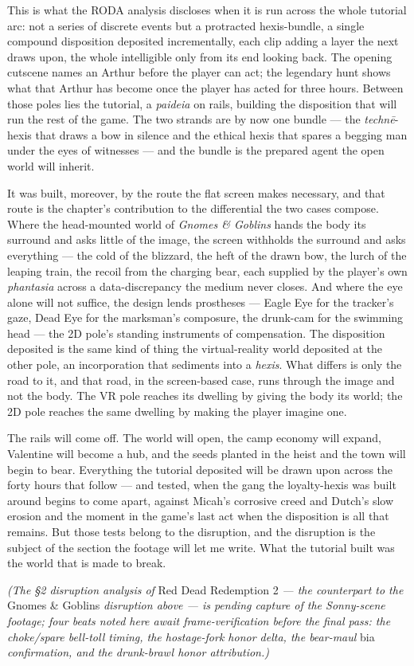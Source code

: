 This is what the RODA analysis discloses when it is run across the whole tutorial arc: not a series of discrete events but a protracted hexis-bundle, a single compound disposition deposited incrementally, each clip adding a layer the next draws upon, the whole intelligible only from its end looking back. The opening cutscene names an Arthur before the player can act; the legendary hunt shows what that Arthur has become once the player has acted for three hours. Between those poles lies the tutorial, a \textit{paideia} on rails, building the disposition that will run the rest of the game. The two strands are by now one bundle — the \textit{technē}-hexis that draws a bow in silence and the ethical hexis that spares a begging man under the eyes of witnesses — and the bundle is the prepared agent the open world will inherit.

It was built, moreover, by the route the flat screen makes necessary, and that route is the chapter's contribution to the differential the two cases compose. Where the head-mounted world of \textit{Gnomes \& Goblins} hands the body its surround and asks little of the image, the screen withholds the surround and asks everything — the cold of the blizzard, the heft of the drawn bow, the lurch of the leaping train, the recoil from the charging bear, each supplied by the player's own \textit{phantasia} across a data-discrepancy the medium never closes. And where the eye alone will not suffice, the design lends prostheses — Eagle Eye for the tracker's gaze, Dead Eye for the marksman's composure, the drunk-cam for the swimming head — the 2D pole's standing instruments of compensation. The disposition deposited is the same kind of thing the virtual-reality world deposited at the other pole, an incorporation that sediments into a \textit{hexis}. What differs is only the road to it, and that road, in the screen-based case, runs through the image and not the body. The VR pole reaches its dwelling by giving the body its world; the 2D pole reaches the same dwelling by making the player imagine one.

The rails will come off. The world will open, the camp economy will expand, Valentine will become a hub, and the seeds planted in the heist and the town will begin to bear. Everything the tutorial deposited will be drawn upon across the forty hours that follow — and tested, when the gang the loyalty-hexis was built around begins to come apart, against Micah's corrosive creed and Dutch's slow erosion and the moment in the game's last act when the disposition is all that remains. But those tests belong to the disruption, and the disruption is the subject of the section the footage will let me write. What the tutorial built was the world that is made to break.

\textit{(The §2 disruption analysis of} Red Dead Redemption 2 \textit{— the counterpart to the} Gnomes \& Goblins \textit{disruption above — is pending capture of the Sonny-scene footage; four beats noted here await frame-verification before the final pass: the choke/spare bell-toll timing, the hostage-fork honor delta, the bear-maul} bia \textit{confirmation, and the drunk-brawl honor attribution.)}


